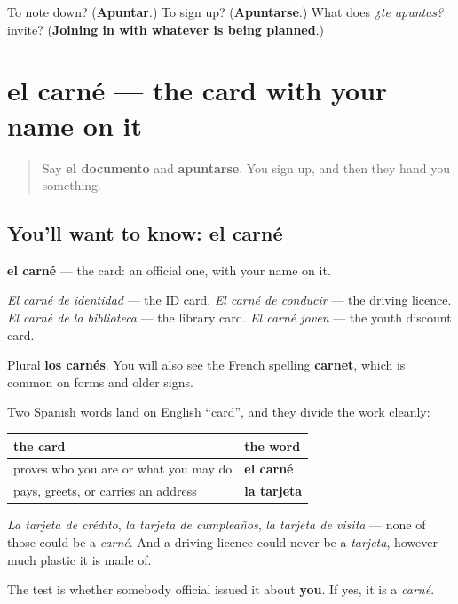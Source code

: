 \begin{tcolorbox}[breakable,colback=teal!4,colframe=teal!35!black,title={Before you move on}]
To note down? (\textbf{Apuntar}.) To sign up? (\textbf{Apuntarse}.) What does \emph{¿te apuntas?} invite? (\textbf{Joining in with whatever is being planned}.)
\end{tcolorbox}
\section[el carné]{el carné — the card with your name on it}

\label{lesson:ES-C451-carne}



\begin{quote}
Say \textbf{el documento} and \textbf{apuntarse}. You sign up, and then they hand you something.
\end{quote}

\subsection*{You'll want to know: el carné}
\textbf{el carné} — the card: an official one, with your name on it.

\emph{El carné de identidad} — the ID card. \emph{El carné de conducir} — the driving licence. \emph{El carné de la biblioteca} — the library card. \emph{El carné joven} — the youth discount card.

Plural \textbf{los carnés}. You will also see the French spelling \textbf{carnet}, which is common on forms and older signs.

\begin{grammarlens}[title={Grammar Lens: carné is not tarjeta}]
Two Spanish words land on English \textquotedblleft{}card\textquotedblright{}, and they divide the work cleanly:

\noindent
\begin{tabularx}{\linewidth}{@{}>{\raggedright\arraybackslash}X>{\raggedright\arraybackslash}X@{}}
\toprule
\textbf{the card} & \textbf{the word} \\
\midrule
proves who you are or what you may do & \textbf{el carné} \\
pays, greets, or carries an address & \textbf{la tarjeta} \\
\bottomrule
\end{tabularx}

\emph{La tarjeta de crédito}, \emph{la tarjeta de cumpleaños}, \emph{la tarjeta de visita} — none of those could be a \emph{carné}. And a driving licence could never be a \emph{tarjeta}, however much plastic it is made of.

The test is whether somebody official issued it about \textbf{you}. If yes, it is a \emph{carné}.
\end{grammarlens}

